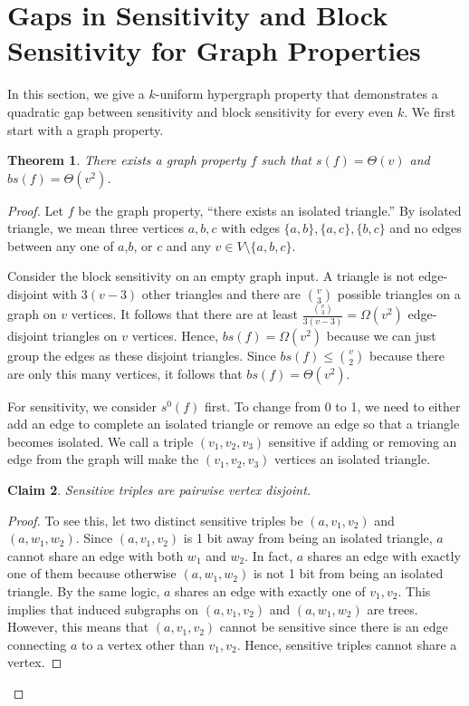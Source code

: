 \documentclass[psamsfonts]{amsart}
\newtheorem{theorem}{Theorem}[section]
\newtheorem{claim}[theorem]{Claim}
\theoremstyle{definition}
\theoremstyle{remark}
\numberwithin{equation}{section}
\begin{document}
\section{Gaps in Sensitivity and Block Sensitivity for Graph Properties}
	In this section, we give a $k$-uniform hypergraph property that demonstrates a quadratic gap between sensitivity and block sensitivity for every even $k$. We first start with a graph property.

	\begin{theorem}
		There exists a graph property $f$ such that $s(f) = \Theta(v)$ and $bs(f) = \Theta(v^2)$.
	\end{theorem} 

	\begin{proof}
		Let $f$ be the graph property, ``there exists an isolated triangle.''  By isolated triangle, we mean three vertices $a,b,c$ with edges $\{a,b\}, \{a,c\}, \{b,c\}$ and no 
		edges between any one of $a$,$b$, or $c$ and any $v \in V\setminus\{a,b,c\}$.

		Consider the block sensitivity on an empty graph input. A triangle is not edge-disjoint with $3(v-3)$ other triangles and there are ${v \choose 3}$ possible triangles on a graph on $v$ vertices. It follows that there are at least $ \frac{{v \choose 3}}{3(v-3)} = \Omega(v^2)$ edge-disjoint triangles on $v$ vertices. Hence, $bs(f) = \Omega(v^2)$ because we can just group the edges as these disjoint triangles. Since $bs(f) \leq {v \choose 2}$ because there are only this many vertices, it follows that $bs(f) = \Theta(v^2)$.

		For sensitivity, we consider $s^0(f)$ first. To change from 0 to 1, we need to either add an edge to complete an isolated triangle or remove an edge so that a triangle becomes isolated. We call a triple $(v_1,v_2,v_3)$ sensitive if adding or removing an edge from the graph will make the $(v_1,v_2,v_3)$ vertices an isolated triangle.

	\begin{claim}
		Sensitive triples are pairwise vertex disjoint. 
	\end{claim}
	\begin{proof}
		To see this, let two distinct sensitive triples be $(a,v_1,v_2)$ and $(a,w_1,w_2)$. Since $(a,v_1,v_2)$ is 1 bit away from being an isolated triangle, $a$ cannot share an edge with both $w_1$ and $w_2$. In fact, $a$ shares an edge with exactly one of them because otherwise $(a,w_1,w_2)$ is not 1 bit from being an isolated triangle. By the same logic, $a$ shares an edge with exactly one of $v_1, v_2$. This implies that induced subgraphs on $(a,v_1,v_2)$ and $(a,w_1,w_2)$ are trees. However, this means that $(a,v_1,v_2)$ cannot be sensitive since there is an edge connecting $a$ to a vertex other than $v_1,v_2$. Hence, sensitive triples cannot share a vertex. 
	\end{proof}


\end{proof}
\end{document}
